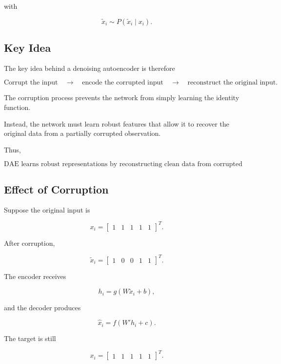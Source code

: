 \documentclass{article}
\begin{document}
with

\[
\widetilde{x}_i
\sim
P(\widetilde{x}_i\mid x_i).
\]


\subsection{Key Idea}

The key idea behind a denoising autoencoder is therefore

\[
\boxed{
	\text{Corrupt the input}
	\quad\rightarrow\quad
	\text{encode the corrupted input}
	\quad\rightarrow\quad
	\text{reconstruct the original input}.
}
\]

The corruption process prevents the network from simply learning the
identity function.

Instead, the network must learn robust features that allow it to
recover the original data from a partially corrupted observation.

Thus,

\[
\boxed{
	\text{DAE learns robust representations by reconstructing clean data
		from corrupted data.}
}
\]

\subsection{Effect of Corruption}

Suppose the original input is

\[
x_i=
\begin{bmatrix}
	1&1&1&1&1
\end{bmatrix}^{T}.
\]

After corruption,

\[
\widetilde{x}_i=
\begin{bmatrix}
	1&0&0&1&1
\end{bmatrix}^{T}.
\]

The encoder receives

\[
h_i=g(W\widetilde{x}_i+b),
\]

and the decoder produces

\[
\widehat{x}_i
=
f(W'h_i+c).
\]

The target is still

\[
x_i=
\begin{bmatrix}
	1&1&1&1&1
\end{bmatrix}^{T}.
\]
\end{document}

